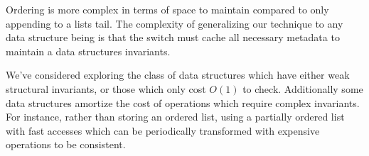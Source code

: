 Ordering is more complex in terms of space to maintain compared to only
appending to a lists tail. The complexity of generalizing our technique to
any data structure being is that the switch must cache all necessary metadata
to maintain a data structures invariants.

We've considered exploring the class of data structures which have either
weak structural invariants, or those which only cost $O(1)$ to check. Additionally some
data structures amortize the cost of operations which require complex
invariants. For instance, rather than storing an ordered list, using a
partially ordered list with fast accesses which can be periodically
transformed with expensive operations to be consistent.













